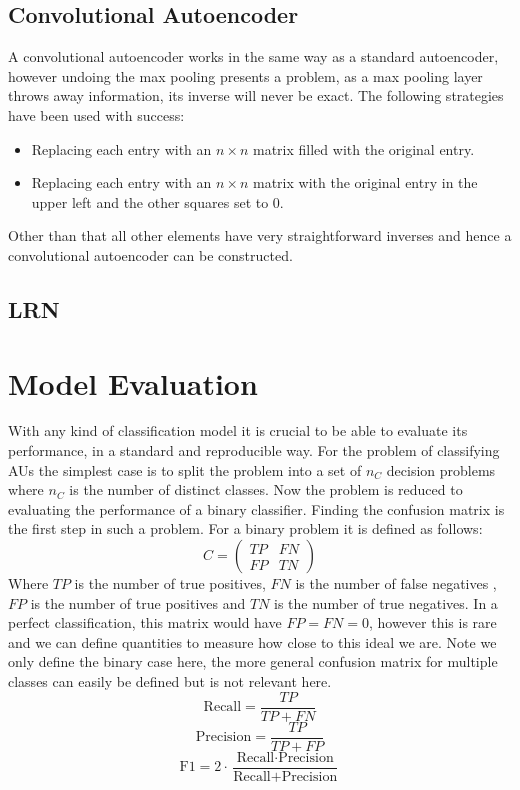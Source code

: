 \subsection{Convolutional Autoencoder}
A convolutional autoencoder works in the same way as a standard autoencoder, however
undoing the max pooling presents a problem, as a max pooling layer throws away
information, its inverse will never be exact. The following strategies have been
used with success:
\begin{itemize}
    \item Replacing each entry with an $n \times n$ matrix filled with the original
    entry.
    \item Replacing each entry with an  $n\times n$  matrix with
    the original entry in the upper left and the other squares set to 0. \cite{Dosovitskiy2015}
\end{itemize}

Other than that all other elements have very straightforward inverses and hence
a convolutional autoencoder can be constructed.
\subsection{LRN}
\section{Model Evaluation}
With any kind of classification model it is crucial to be able to evaluate its
performance, in a standard and reproducible way. For the problem of classifying
AUs the simplest case is to split the problem into a set of $n_C$ decision problems
where $n_C$ is the number of distinct classes. Now the problem is reduced to
evaluating the performance of a binary classifier. Finding the confusion matrix is
the first step in such a problem. For a binary problem it is defined as follows:
\begin{equation}
C =
\begin{pmatrix}
TP & FN\\
FP & TN
\end{pmatrix}
\end{equation}
Where $TP$ is the number of true positives, $FN$ is the number of false negatives
, $FP$ is the number of true positives and $TN$ is the number of true negatives.
In a perfect classification, this matrix would have $FP=FN=0$, however this is rare
and we can define quantities to measure how close to this ideal we are. Note we
only define the binary case here, the more general confusion matrix for multiple
classes can easily be defined but is not relevant here.
\begin{equation}
\text{Recall} = \frac{TP}{TP+FN}
\end{equation}
\begin{equation}
\text{Precision} = \frac{TP}{TP+FP}
\end{equation}
\begin{equation}
\text{F1} = 2 \cdot \frac{\text{Recall} \cdot \text{Precision}}{\text{Recall} + \text{Precision}}
\end{equation}

